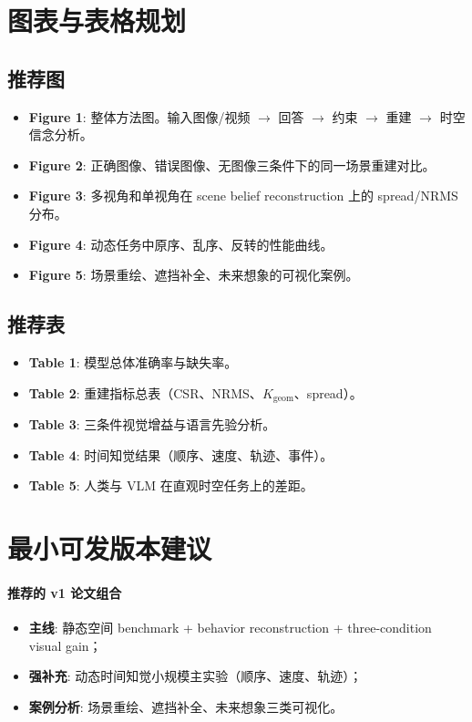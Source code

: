\documentclass[UTF8,12pt,fontset=none]{ctexart}
\begin{document}
\section{图表与表格规划}

\subsection{推荐图}
\begin{itemize}
  \item \textbf{Figure 1}: 整体方法图。输入图像/视频 $\rightarrow$ 回答 $\rightarrow$ 约束 $\rightarrow$ 重建 $\rightarrow$ 时空信念分析。
  \item \textbf{Figure 2}: 正确图像、错误图像、无图像三条件下的同一场景重建对比。
  \item \textbf{Figure 3}: 多视角和单视角在 scene belief reconstruction 上的 spread/NRMS 分布。
  \item \textbf{Figure 4}: 动态任务中原序、乱序、反转的性能曲线。
  \item \textbf{Figure 5}: 场景重绘、遮挡补全、未来想象的可视化案例。
\end{itemize}

\subsection{推荐表}
\begin{itemize}
  \item \textbf{Table 1}: 模型总体准确率与缺失率。
  \item \textbf{Table 2}: 重建指标总表（CSR、NRMS、$K_{\text{geom}}$、spread）。
  \item \textbf{Table 3}: 三条件视觉增益与语言先验分析。
  \item \textbf{Table 4}: 时间知觉结果（顺序、速度、轨迹、事件）。
  \item \textbf{Table 5}: 人类与 VLM 在直观时空任务上的差距。
\end{itemize}

\section{最小可发版本建议}

\paragraph{推荐的 v1 论文组合}
\begin{itemize}
  \item \textbf{主线}: 静态空间 benchmark + behavior reconstruction + three-condition visual gain；
  \item \textbf{强补充}: 动态时间知觉小规模主实验（顺序、速度、轨迹）；
  \item \textbf{案例分析}: 场景重绘、遮挡补全、未来想象三类可视化。
\end{itemize}
\end{document}
